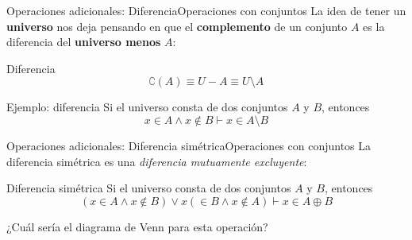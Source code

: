 \documentclass[spanish, c]{beamer}
\newcommand\blfootnote[1]{%
\begingroup
\renewcommand\thefootnote{}\footnote{#1}%
\addtocounter{footnote}{-1}%
\endgroup
}
\begin{document}

\begin{frame}{Operaciones adicionales: Diferencia}{Operaciones con conjuntos}
    La idea de tener un \textbf{universo} nos deja pensando en que el \textbf{complemento} de un conjunto $A$ es la \alert{diferencia} del \textbf{universo menos} $A$:

    \begin{block}{Diferencia}
        $$\complement(A) \equiv U - A \equiv U \setminus A$$
    \end{block}

    \bigskip

    \begin{block}{Ejemplo: diferencia}
        Si el universo consta de dos conjuntos $A$ y $B$, entonces
        $$x \in A \wedge x \not \in B \vdash x \in A \setminus B$$
    \end{block}
\end{frame}

\begin{frame}{Operaciones adicionales: Diferencia simétrica}{Operaciones con conjuntos}
    La \alert{diferencia simétrica} es una \textit{diferencia mutuamente excluyente}:

    \bigskip

    \begin{block}{Diferencia simétrica}
        Si el universo consta de dos conjuntos $A$ y $B$, entonces
        $$(x \in A \wedge x \not \in B) \vee x (\in B \wedge x \not \in A) \vdash x \in A \oplus B$$
    \end{block} \pause

    \bigskip

    ¿Cuál sería el diagrama de Venn para esta operación?
\end{frame}
\end{document}

